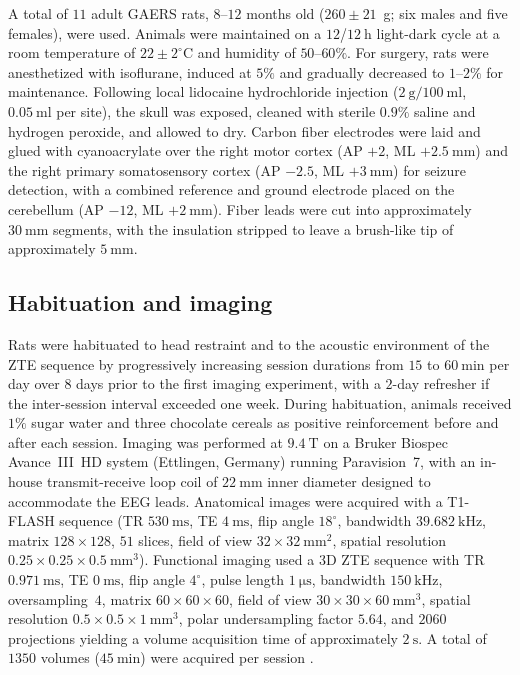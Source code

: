 \documentclass[11pt]{article}
\begin{document}
A total of $11$ adult GAERS rats, $8$--$12$ months old ($260 \pm 21$~g; six males and five females), were used. Animals were maintained on a $12$/$12~\si{\hour}$ light-dark cycle at a room temperature of $22 \pm 2^\circ\text{C}$ and humidity of $50$--$60\%$. For surgery, rats were anesthetized with isoflurane, induced at $5\%$ and gradually decreased to $1$--$2\%$ for maintenance. Following local lidocaine hydrochloride injection ($2~\text{g}/100~\text{ml}$, $0.05~\text{ml}$ per site), the skull was exposed, cleaned with sterile $0.9\%$ saline and hydrogen peroxide, and allowed to dry. Carbon fiber electrodes were laid and glued with cyanoacrylate over the right motor cortex (AP $+2$, ML $+2.5~\si{\milli\metre}$) and the right primary somatosensory cortex (AP $-2.5$, ML $+3~\si{\milli\metre}$) for seizure detection, with a combined reference and ground electrode placed on the cerebellum (AP $-12$, ML $+2~\si{\milli\metre}$). Fiber leads were cut into approximately $30~\si{\milli\metre}$ segments, with the insulation stripped to leave a brush-like tip of approximately $5~\si{\milli\metre}$.

\subsection{Habituation and imaging}

Rats were habituated to head restraint and to the acoustic environment of the ZTE sequence by progressively increasing session durations from $15$ to $60~\si{\minute}$ per day over $8$ days prior to the first imaging experiment, with a $2$-day refresher if the inter-session interval exceeded one week. During habituation, animals received $1\%$ sugar water and three chocolate cereals as positive reinforcement before and after each session. Imaging was performed at $9.4~\si{\tesla}$ on a Bruker Biospec Avance~III~HD system (Ettlingen, Germany) running Paravision~7, with an in-house transmit-receive loop coil of $22~\si{\milli\metre}$ inner diameter designed to accommodate the EEG leads. Anatomical images were acquired with a T1-FLASH sequence (TR $530~\si{\milli\second}$, TE $4~\si{\milli\second}$, flip angle $18^\circ$, bandwidth $39.682~\si{\kilo\hertz}$, matrix $128 \times 128$, $51$ slices, field of view $32 \times 32~\si{\milli\metre^2}$, spatial resolution $0.25 \times 0.25 \times 0.5~\si{\milli\metre^3}$). Functional imaging used a 3D ZTE sequence with TR $0.971~\si{\milli\second}$, TE $0~\si{\milli\second}$, flip angle $4^\circ$, pulse length $1~\si{\micro\second}$, bandwidth $150~\si{\kilo\hertz}$, oversampling~$4$, matrix $60 \times 60 \times 60$, field of view $30 \times 30 \times 60~\si{\milli\metre^3}$, spatial resolution $0.5 \times 0.5 \times 1~\si{\milli\metre^3}$, polar undersampling factor $5.64$, and $2060$ projections yielding a volume acquisition time of approximately $2~\si{\second}$. A total of $1350$ volumes ($45~\si{\minute}$) were acquired per session \citep{wiesinger2022}.
\end{document}
